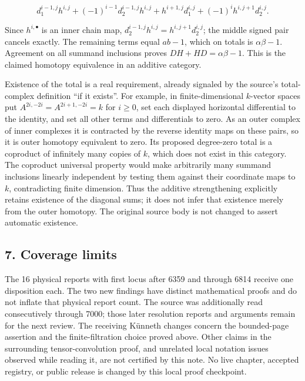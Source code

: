 \[
d_1^{i-1,j}h^{i,j}
+(-1)^{i-1}d_2^{i-1,j}h^{i,j}
+h^{i+1,j}d_1^{i,j}
+(-1)^ih^{i,j+1}d_2^{i,j}.
\]

Since \(h^{i,\bullet}\) is an inner chain map, \(d_2^{i-1,j}h^{i,j}=h^{i,j+1}d_2^{i,j}\); the middle signed pair cancels exactly. The remaining terms equal \(ab-1\), which on totals is \(\alpha\beta-1\). Agreement on all summand inclusions proves \(DH+HD=\alpha\beta-1\). This is the claimed homotopy equivalence in an additive category.

Existence of the total is a real requirement, already signaled by the source's total-complex definition ``if it exists''. For example, in finite-dimensional \(k\)-vector spaces put \(A^{2i,-2i}=A^{2i+1,-2i}=k\) for \(i\geq0\), set each displayed horizontal differential to the identity, and set all other terms and differentials to zero. As an outer complex of inner complexes it is contracted by the reverse identity maps on these pairs, so it is outer homotopy equivalent to zero. Its proposed degree-zero total is a coproduct of infinitely many copies of \(k\), which does not exist in this category. The coproduct universal property would make arbitrarily many summand inclusions linearly independent by testing them against their coordinate maps to \(k\), contradicting finite dimension. Thus the additive strengthening explicitly retains existence of the diagonal sums; it does not infer that existence merely from the outer homotopy. The original source body is not changed to assert automatic existence.

\subsection{7. Coverage limits}\label{note-07-coverage-limits}

The 16 physical reports with first locus after 6359 and through 6814 receive one disposition each. The two new findings have distinct mathematical proofs and do not inflate that physical report count. The source was additionally read consecutively through 7000; those later resolution reports and arguments remain for the next review. The receiving Künneth changes concern the bounded-page assertion and the finite-filtration choice proved above. Other claims in the surrounding tensor-convolution proof, and unrelated local notation issues observed while reading it, are not certified by this note. No live chapter, accepted registry, or public release is changed by this local proof checkpoint.

